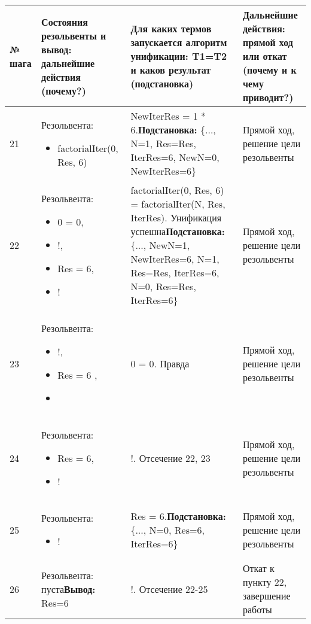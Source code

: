 \documentclass[14pt,a4paper]{scrreprt}
\begin{document}
\begin{table}[H]
	\begin{tabular}{|p{0.8cm\small}|p{4.7cm\small}|p{5.7cm\small}|p{4cm\small}|}	
		\hline
		№ шага & Состояния резольвенты и вывод: дальнейшие действия (почему?) & Для каких термов запускается алгоритм унификации: T1=T2 и каков результат (подстановка) & Дальнейшие действия: прямой ход или откат (почему и к чему приводит?)\\
		\hline
		21 & Резольвента:\begin{itemize} \item factorialIter(0, Res, 6) \end{itemize} & NewIterRes = 1 * 6.\linebreak \textbf{Подстановка:} \{..., N=1, Res=Res, IterRes=6, NewN=0, NewIterRes=6\} & Прямой ход, решение цели резольвенты\\
		\hline
		22 & Резольвента:\begin{itemize} \item 0 = 0, \item !, \item Res = 6, \item ! \end{itemize} & factorialIter(0, Res, 6) = factorialIter(N, Res, IterRes). Унификация успешна\linebreak \textbf{Подстановка:} \{..., NewN=1, NewIterRes=6, N=1, Res=Res, IterRes=6, N=0, Res=Res, IterRes=6\} & Прямой ход, решение цели резольвенты\\
		\hline
		23 & Резольвента:\begin{itemize} \item !, \item Res = 6 ,\item \end{itemize} & 0 = 0. Правда & Прямой ход, решение цели резольвенты\\
		\hline
		24 & Резольвента:\begin{itemize} \item Res = 6, \item ! \end{itemize} & !. Отсечение 22, 23 & Прямой ход, решение цели резольвенты\\
		\hline
		25 & Резольвента:\begin{itemize} \item ! \end{itemize} & Res = 6.\linebreak \textbf{Подстановка:} \{..., N=0, Res=6, IterRes=6\} & Прямой ход, решение цели резольвенты\\
		\hline
		26 & Резольвента: пуста\linebreak \textbf{Вывод:} Res=6 & !. Отсечение 22-25 & Откат к пункту 22, завершение работы \\
		\hline
	\end{tabular}
\end{table}
\end{document}
